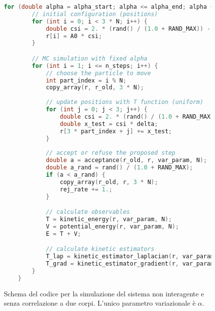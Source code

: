 \documentclass[a4paper, titlepage]{article}
\begin{document}
\begin{figure}[h!]
    \begin{lstlisting}[language=C]
    for (double alpha = alpha_start; alpha <= alpha_end; alpha += alpha_step) {
        // initial configuration (positions)
        for (int i = 0; i < 3 * N; i++) {
            double csi = 2. * (rand() / (1.0 + RAND_MAX)) - 1.;
            r[i] = A0 * csi;
        }

        // MC simulation with fixed alpha
        for (int i = 1; i <= n_steps; i++) {
            // choose the particle to move
            int part_index = i % N;
            copy_array(r, r_old, 3 * N);
            
            // update positions with T function (uniform)
            for (int j = 0; j < 3; j++) {
                double csi = 2. * (rand() / (1.0 + RAND_MAX)) - 1.;
                double x_test = csi * delta;
                r[3 * part_index + j] += x_test;
            }
            
            // accept or refuse the proposed step
            double a = acceptance(r_old, r, var_param, N);
            double a_rand = rand() / (1.0 + RAND_MAX);
            if (a < a_rand) {
                copy_array(r_old, r, 3 * N);
                rej_rate += 1.;
            } 

            // calculate observables
            T = kinetic_energy(r, var_param, N);
            V = potential_energy(r, var_param, N);
            E = T + V;

            // calculate kinetic estimators
            T_lap = kinetic_estimator_laplacian(r, var_param, N);
            T_grad = kinetic_estimator_gradient(r, var_param, N);
        }
    }
    \end{lstlisting}
    \caption{Schema del codice per la simulazione del sistema non interagente e senza correlazione a due corpi. L'unico parametro variazionale è $\alpha$.}
    \label{code:scheme}
\end{figure}
\end{document}
